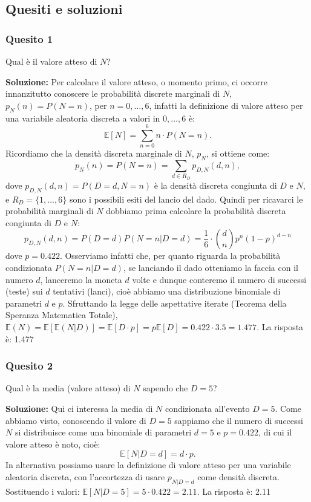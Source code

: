 \documentclass[12pt, a4paper]{article}
\begin{document}
\subsection*{Quesiti e soluzioni}

\subsubsection*{Quesito 1}
Qual è il valore atteso di $N$?

\textbf{Soluzione:}
Per calcolare il valore atteso, o momento primo, ci occorre innanzitutto conoscere le probabilità discrete marginali di $N$, $p_N(n)=P(N=n)$, per $n=0,\dots,6$, infatti la definizione di valore atteso per una variabile aleatoria discreta a valori in $0,\dots,6$ è:
$$ \mathbb{E}[N] = \sum_{n=0}^6 n \cdot P(N=n). $$
Ricordiamo che la densità discreta marginale di $N$, $p_N$, si ottiene come:
$$ p_N(n) = P(N=n) = \sum_{d \in R_D} p_{D,N}(d,n), $$
dove $p_{D,N}(d,n)=P(D=d,N=n)$ è la densità discreta congiunta di $D$ e $N$, e $R_D=\{1,\dots,6\}$ sono i possibili esiti del lancio del dado.
Quindi per ricavarci le probabilità marginali di $N$ dobbiamo prima calcolare la probabilità discreta congiunta di $D$ e $N$:
$$ p_{D,N}(d,n) = P(D=d)P(N=n|D=d) = \frac{1}{6} \cdot \binom{d}{n} p^n (1-p)^{d-n} $$
dove $p=0.422$. Osserviamo infatti che, per quanto riguarda la probabilità condizionata $P(N=n|D=d)$, se lanciando il dado otteniamo la faccia con il numero $d$, lanceremo la moneta $d$ volte e dunque conteremo il numero di successi (teste) sui $d$ tentativi (lanci), cioè abbiamo una distribuzione binomiale di parametri $d$ e $p$.
Sfruttando la legge delle aspettative iterate (Teorema della Speranza Matematica Totale), $\mathbb{E}(N) = \mathbb{E}[\mathbb{E}(N|D)] = \mathbb{E}[D \cdot p] = p\mathbb{E}[D] = 0.422 \cdot 3.5 = 1.477$.
La risposta è: 1.477

\subsubsection*{Quesito 2}
Qual è la media (valore atteso) di $N$ sapendo che $D=5$?

\textbf{Soluzione:}
Qui ci interessa la media di $N$ condizionata all’evento $D=5$. Come abbiamo visto, conoscendo il valore di $D=5$ sappiamo che il numero di successi $N$ si distribuisce come una binomiale di parametri $d=5$ e $p=0.422$, di cui il valore atteso è noto, cioè:
$$ \mathbb{E}[N|D=d] = d \cdot p. $$
In alternativa possiamo usare la definizione di valore atteso per una variabile aleatoria discreta, con l’accortezza di usare $p_{N|D=d}$ come densità discreta.
Sostituendo i valori: $\mathbb{E}[N|D=5] = 5 \cdot 0.422 = 2.11$.
La risposta è: 2.11
\end{document}
